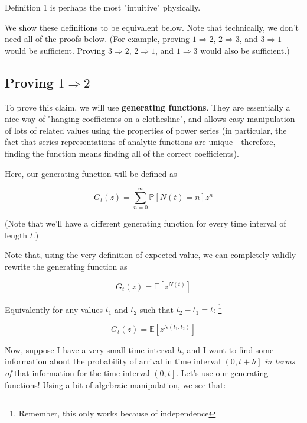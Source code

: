 \documentclass{article}
\begin{document}
Definition 1 is perhaps the most "intuitive" physically. 

We show these definitions to be equivalent below. Note that technically, we don't need all of the proofs below. (For example, proving $1 \Rightarrow 2$, $2 \Rightarrow 3$, and $3 \Rightarrow 1$ would be sufficient. Proving $3 \Rightarrow 2$, $2 \Rightarrow 1$, and $1 \Rightarrow 3$ would also be sufficient.) 


\subsection{Proving $1 \Rightarrow 2$}


To prove this claim, we will use \textbf{generating functions}. They are essentially a nice way of "hanging coefficients on a clothesline", and allows easy manipulation of lots of related values using the properties of power series (in particular, the fact that series representations of analytic functions are unique - therefore, finding the function means finding all of the correct coefficients).

Here, our generating function will be defined as 

\begin{equation}
G_t(z) = \sum_{n=0}^\infty \mathbb{P}[N(t) = n] z^n
\end{equation}

(Note that we'll have a different generating function for every time interval of length $t$.)

Note that, using the very definition of expected value, we can completely validly rewrite the generating function as 

\begin{equation}
G_t(z) = \mathbb{E}[z^{N(t)}]
\end{equation}

Equivalently for any values $t_1$ and $t_2$ such that $t_2 - t_1 = t$: \footnote{Remember, this only works because of independence}

\begin{equation}
G_t(z) = \mathbb{E}[z^{N(t_1, t_2)}]
\end{equation}


Now, suppose I have a very small time interval $h$, and I want to find some information about the probability of arrival in time interval $\left(0, t+h\right]$ \textit{in terms of} that information for the time interval $\left(0, t\right]$. Let's use our generating functions! Using a bit of algebraic manipulation, we see that:
\end{document}
